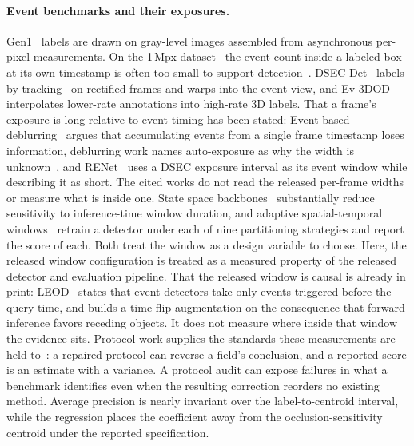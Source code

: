\documentclass[10pt,twocolumn,letterpaper]{article}
\begin{document}
\paragraph{Event benchmarks and their exposures.}
Gen1~\cite{detournemire2020gen1} labels are drawn on gray-level images assembled
from asynchronous per-pixel measurements. On the 1\,Mpx
dataset~\cite{perot2020megapixel} the event count inside a labeled box at its own
timestamp is often too small to support detection~\cite{kugele2023howmany}.
DSEC-Det~\cite{gehrig2024lowlatency} labels by tracking~\cite{pang2021qdtrack} on
rectified frames and warps into the event view, and
Ev-3DOD~\cite{cho2025ev3dod} interpolates lower-rate annotations into high-rate
3D labels. That a frame's exposure is long relative to event timing has been
stated: Event-based deblurring~\cite{sun2023refid} argues that accumulating events from a single
frame timestamp loses information, deblurring work names auto-exposure as why the
width is unknown~\cite{kim2022unknownexposure}, and RENet~\cite{zhou2022renet}
uses a DSEC exposure interval as its event window while describing it as short.
The cited works do not read the released per-frame widths or measure what is
inside one. State space backbones~\cite{zubic2024ssm} substantially reduce sensitivity to
inference-time window duration, and
adaptive spatial-temporal windows~\cite{sui2026astw} retrain a detector under
each of nine partitioning strategies and report the score of each. Both treat the
window as a design variable to choose. Here, the released window configuration is
treated as a measured property of the released detector and evaluation pipeline.
That the released window is causal is already in print:
LEOD~\cite{wu2024leod} states that event detectors take only events triggered
before the query time, and builds a time-flip augmentation on the consequence
that forward inference favors receding objects. It does not measure where inside
that window the evidence sits. Protocol
work supplies the standards these measurements are held
to~\cite{oncalibration2024,stratification2024,northcutt2021labelerrors,ercan2023evreal}:
a repaired protocol can reverse a field's conclusion, and a reported score is
an estimate with a variance. A protocol audit can expose failures in what a
benchmark identifies even when the resulting correction reorders no existing
method. Average precision is nearly invariant over the label-to-centroid interval,
while the regression places the coefficient away from the occlusion-sensitivity
centroid under the reported specification.
\end{document}
